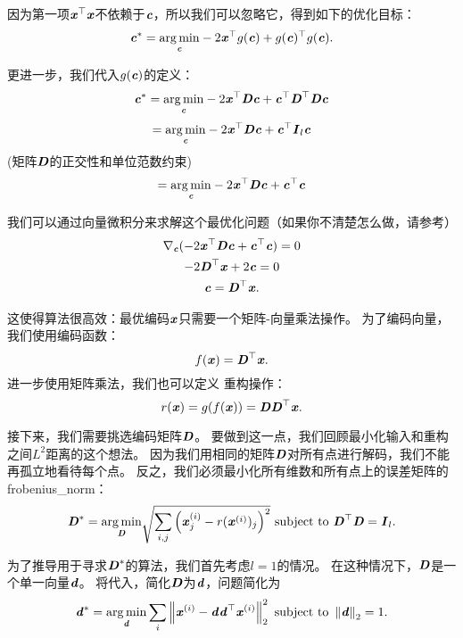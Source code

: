 因为第一项$\Vx^\top\Vx$不依赖于$\Vc$，所以我们可以忽略它，得到如下的优化目标：
\begin{equation}
\Vc^* = \underset{\Vc}{\arg\min} - 2\Vx^\top g(\Vc) + g(\Vc)^\top g(\Vc).
\end{equation}


更进一步，我们代入$g(\Vc)$的定义：
\begin{equation}
    \Vc^* = \underset{\Vc}{\arg\min} - 2\Vx^\top\MD\Vc + \Vc^\top\MD^\top\MD\Vc
\end{equation}
\begin{equation}
    = \underset{\Vc}{\arg\min} -2\Vx^\top\MD\Vc + \Vc^\top\MI_l\Vc
\end{equation}
(矩阵$\MD$的正交性和单位范数约束)
\begin{equation}
    = \underset{\Vc}{\arg\min} -2\Vx^\top\MD\Vc + \Vc^\top\Vc
\end{equation}


我们可以通过向量微积分来求解这个最优化问题（如果你不清楚怎么做，请参考）
\begin{gather}
    \nabla_{\Vc} (-2\Vx^\top \MD \Vc + \Vc^\top\Vc) = 0\\
    -2\MD^\top\Vx + 2\Vc = 0\\
    \Vc = \MD^\top \Vx.
\end{gather}


这使得算法很高效：最优编码$\Vx$只需要一个矩阵-向量乘法操作。
为了编码向量，我们使用编码函数：
\begin{equation}
    f(\Vx)=\MD^\top\Vx.
\end{equation}
进一步使用矩阵乘法，我们也可以定义\,\,重构操作：
\begin{equation}
    r(\Vx)=g(f(\Vx)) = \MD\MD^\top \Vx.
\label{eq:2.67}
\end{equation}


接下来，我们需要挑选编码矩阵$\MD$。
要做到这一点，我们回顾最小化输入和重构之间$L^2$距离的这个想法。
因为我们用相同的矩阵$\MD$对所有点进行解码，我们不能再孤立地看待每个点。
反之，我们必须最小化所有维数和所有点上的误差矩阵的\,\gls{frobenius_norm}：
\begin{equation}
    \MD^* =  \underset{\MD}{\arg\min} \sqrt{\sum_{i,j}\left( \Vx_j^{(i)} - r(\Vx^{(i)})_j\right)^2} \text{ subject to } \MD^\top\MD = \MI_l.
\label{eq:2.68}
\end{equation}

为了推导用于寻求$\MD^*$的算法，我们首先考虑$l=1$的情况。
在这种情况下，$\MD$是一个单一向量$\Vd$。
将代入，简化$\MD$为$\Vd$，问题简化为
\begin{equation}
\label{eq:2.67}
    \Vd^* = \underset{\Vd}{\arg\min} \sum_i \norm{\Vx^{(i)} - \Vd\Vd^\top \Vx^{(i)}}_2^2
    \text{ subject to } \norm{\Vd}_2 = 1.
\end{equation}

